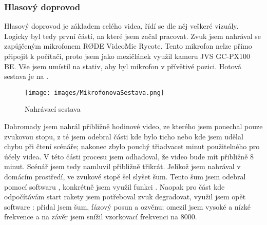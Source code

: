{\subsubsection{Hlasový doprovod}
{Hlasový doprovod je základem celého videa, řídí se dle něj veškeré vizuály. Logicky byl tedy první částí, na které jsem začal pracovat.}\odst
{Zvuk jsem nahrával se zapůjčeným mikrofonem RØDE VideoMic Rycote. Tento mikrofon nelze přímo připojit k počítači, proto jsem jako mezičlánek využil kameru JVS GC-PX100 BE. Vše jsem umístil na stativ, aby byl mikrofon v přívětivé pozici. Hotová sestava je na .}

\begin{figure}[H]
    \centering
    \texttt{[image: images/MikrofonovaSestava.png]}
    \caption{Nahrávací sestava \jaFoto}
    \label{obr:nahravaciSestava}
\end{figure}

{Dohromady jsem nahrál přibližně hodinové video, ze kterého jsem ponechal pouze zvukovou stopu, z té jsem odebral části kde bylo ticho nebo kde jsem udělal chybu při čtení scénáře; nakonec zbylo pouchý třiadvacet minut použitelného pro účely videa. V této části procesu jsem odhadoval, že video bude mít přibližně 8 minut. Scénář jsem tedy namluvil přibližně třikrát.}\odst
{Jelikož jsem nahrával v domácím prostředí, ve zvukové stopě šel slyšet šum. Tento šum jsem odebral pomocí softwaru , konkrétně jsem využil funkci .}\odst
{Naopak pro část kde odpočítávám start rakety jsem potřeboval zvuk degradovat, využil jsem opět software : přidal jsem šum, fázový posun a ozvěnu; omezil jsem vysoké a nízké frekvence a na závěr jsem snížil vzorkovací frekvenci na 8000.}

\newpage

}

